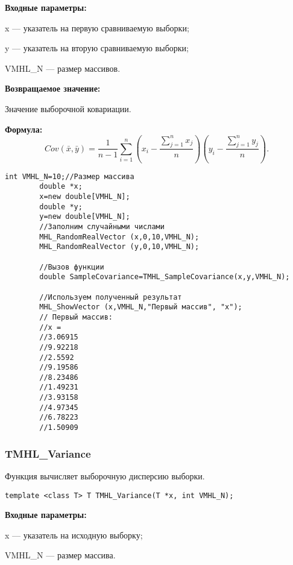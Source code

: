 \documentclass[a4paper,12pt]{article}
\begin{document}
\textbf{Входные параметры:}
 
x --- указатель на первую сравниваемую выборки;
 
y --- указатель на вторую сравниваемую выборки;
 
VMHL\_N --- размер массивов.

\textbf{Возвращаемое значение:}
 
Значение выборочной ковариации.

\textbf{Формула:}
\begin{equation*}
Cov\left(\bar{x},\bar{y} \right)= \dfrac{1}{n-1}\sum_{i=1}^{n} \left( x_i-\dfrac{\sum_{j=1}^{n}x_j}{n}\right)\left( y_i-\dfrac{\sum_{j=1}^{n}y_j}{n}\right) .
\end{equation*}



\begin{lstlisting}[label=code_use_TMHL_SampleCovariance,caption=Пример использования]
        int VMHL_N=10;//Размер массива
        double *x;
        x=new double[VMHL_N];
        double *y;
        y=new double[VMHL_N];
        //Заполним случайными числами
        MHL_RandomRealVector (x,0,10,VMHL_N);
        MHL_RandomRealVector (y,0,10,VMHL_N);

        //Вызов функции
        double SampleCovariance=TMHL_SampleCovariance(x,y,VMHL_N);

        //Используем полученный результат
        MHL_ShowVector (x,VMHL_N,"Первый массив", "x");
        // Первый массив:
        //x =
        //3.06915
        //9.92218
        //2.5592
        //9.19586
        //8.23486
        //1.49231
        //3.93158
        //4.97345
        //6.78223
        //1.50909
\end{lstlisting}

\subsubsection{TMHL\_Variance}\label{TMHL_Variance}

Функция вычисляет выборочную дисперсию выборки.


\begin{lstlisting}[label=code_syntax_TMHL_Variance,caption=Синтаксис]
template <class T> T TMHL_Variance(T *x, int VMHL_N);
\end{lstlisting}

\textbf{Входные параметры:}
 
x --- указатель на исходную выборку;
 
VMHL\_N --- размер массива.
\end{document}
